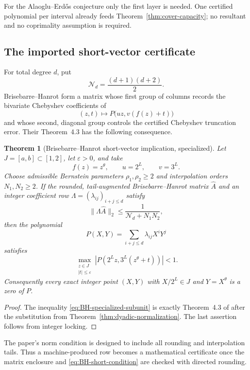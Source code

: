 \documentclass[11pt,oneside]{article}
\newtheorem{theorem}{Theorem}[section]
\theoremstyle{definition}
\theoremstyle{remark}
\newcommand{\AEconj}{Alaoglu--Erd\H{o}s}
\newcommand{\tht}{\theta}
\newcommand{\Nm}{\mathcal N}
\begin{document}
For the \AEconj{} conjecture only the first layer is needed.  One certified polynomial per interval
already feeds Theorem~\ref{thm:cover-capacity}; no resultant and no coprimality assumption is
required.

\subsection{The imported short-vector certificate}

For total degree $d$, put
\[
  \Nm_d=\frac{(d+1)(d+2)}2.
\]
Brisebarre--Hanrot form a matrix whose first group of columns records the bivariate Chebyshev
coefficients of
\[
  (z,t)\longmapsto P\bigl(uz,v(f(z)+t)\bigr)
\]
and whose second, diagonal group controls the certified Chebyshev truncation error.  Their
Theorem~4.3 has the following consequence.

\begin{theorem}[Brisebarre--Hanrot short-vector implication, specialized]
\label{thm:BH-short-vector}
Let $J=[a,b]\subset[1,2]$, let $\varepsilon>0$, and take
\[
  f(z)=z^\tht,\qquad u=2^L,\qquad v=3^L.
\]
Choose admissible Bernstein parameters $\rho_1,\rho_2\ge2$ and interpolation orders
$N_1,N_2\ge2$.  If the rounded, tail-augmented Brisebarre--Hanrot matrix $\widehat A$ and an
integer coefficient row $\Lambda=(\lambda_{ij})_{i+j\le d}$ satisfy
\begin{equation}
  \|\Lambda\widehat A\|_2\le
  \frac1{\Nm_d+N_1N_2},
  \label{eq:BH-short-condition}
\end{equation}
then the polynomial
\[
  P(X,Y)=\sum_{i+j\le d}\lambda_{ij}X^iY^j
\]
satisfies
\begin{equation}
  \max_{\substack{z\in J\\ |t|\le\varepsilon}}
  |P(2^Lz,3^L(z^\tht+t))|<1.
  \label{eq:BH-specialized-subunit}
\end{equation}
Consequently every exact integer point $(X,Y)$ with $X/2^L\in J$ and $Y=X^\tht$ is a zero of
$P$.
\end{theorem}

\begin{proof}
The inequality \eqref{eq:BH-specialized-subunit} is exactly Theorem~4.3 of
\cite{BrisebarreHanrot2026} after the substitution from
Theorem~\ref{thm:dyadic-normalization}.  The last assertion follows from integer locking.
\end{proof}

The paper's norm condition is designed to include all rounding and interpolation tails.  Thus a
machine-produced row becomes a mathematical certificate once the matrix enclosure and
\eqref{eq:BH-short-condition} are checked with directed rounding.
\end{document}
